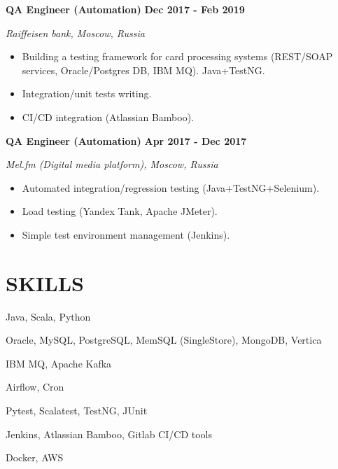 \documentclass[11pt,a4paper]{article}
\newcommand{\timeperiod}[1]{%
    \hfill{\small\textbf{#1}}\par%
}
\begin{document}
\textbf{QA Engineer (Automation)}\timeperiod{Dec 2017 - Feb 2019}
\textit{Raiffeisen bank, Moscow, Russia}
\begin{itemize}
    \item Building a testing framework for card processing systems (REST/SOAP services, Oracle/Postgres DB, IBM MQ). Java+TestNG.
    \item Integration/unit tests writing.
    \item CI/CD integration (Atlassian Bamboo).
\end{itemize}

\textbf{QA Engineer (Automation)}\timeperiod{Apr 2017 - Dec 2017}
\textit{Mel.fm (Digital media platform), Moscow, Russia}
\begin{itemize}
    \item Automated integration/regression testing (Java+TestNG+Selenium).
    \item Load testing (Yandex Tank, Apache JMeter).
    \item Simple test environment management (Jenkins).
\end{itemize}

\section{SKILLS}
\begin{description}[labelwidth=1.5cm,leftmargin=!]
    \item[Languages] Java, Scala, Python
    \item[DBs] Oracle, MySQL, PostgreSQL, MemSQL (SingleStore), MongoDB, Vertica
    \item[MQs] IBM MQ, Apache Kafka
    \item[Schedulers] Airflow, Cron
    \item[Testing] Pytest, Scalatest, TestNG, JUnit
    \item[CI/CD tools] Jenkins, Atlassian Bamboo, Gitlab CI/CD tools
    \item[Other] Docker, AWS
\end{description}
\end{document}
